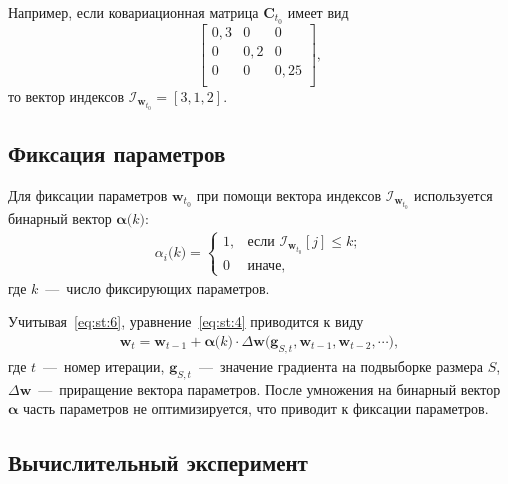 Например, если ковариационная матрица $\textbf{C}_{t_0}$  имеет вид
 $$
\begin{bmatrix}
0{,}3& 0 & 0\\
0& 0{,}2 & 0\\
0& 0 & 0{,}25\\
\end{bmatrix},
 $$
 то вектор индексов $\mathcal{I}_{\textbf{w}_{t_0}} = [3,1,2]$.
 

\subsection{Фиксация параметров}
Для фиксации параметров $\textbf{w}_{t_0}$ при помощи вектора индексов $\mathcal{I}_{\textbf{w}_{t_0}}$ используется бинарный вектор $\bm{\alpha}\bigr(k\bigr)$:
\begin{equation}
\label{eq:st:6}
\begin{aligned}
\alpha_i\bigr(k\bigr) = \begin{cases}
   1, &\text{если }\mathcal{I}_{\textbf{w}_{t_0}}[j] \leq k;\\
   0 &\text{иначе},
 \end{cases}
\end{aligned}
\end{equation}
 где $k$~---~число фиксирующих параметров.
 
 Учитывая~\eqref{eq:st:6}, уравнение~\eqref{eq:st:4} приводится к виду
 \begin{equation}
\label{eq:st:7}
\begin{aligned}
\textbf{w}_{t} = \textbf{w}_{t-1} + \bm{\alpha}\bigr(k\bigr)\cdot\Delta\textbf{w}\bigr(\textbf{g}_{S,t}, \textbf{w}_{t-1}, \textbf{w}_{t-2}, \cdots\bigr),
\end{aligned}
\end{equation}
где $t$~---~номер итерации, $\textbf{g}_{S,t}$~---~значение градиента на подвыборке размера $S$, $\Delta\textbf{w}$~---~приращение вектора параметров. После умножения на бинарный вектор $\bm\alpha$ часть параметров не оптимизируется, что приводит к фиксации параметров.

\subsection{Вычислительный эксперимент}

